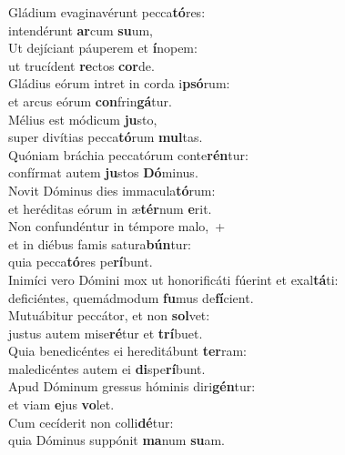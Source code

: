 \evenverse Gládium evaginavérunt pecca\textbf{tó}res:~\*\\
\evenverse intendérunt \textbf{ar}cum \textbf{su}um,\\
\oddverse Ut dejíciant páuperem et \textbf{í}nopem:~\*\\
\oddverse ut trucídent \textbf{re}ctos \textbf{cor}de.\\
\evenverse Gládius eórum intret in corda i\textbf{psó}rum:~\*\\
\evenverse et arcus eórum \textbf{con}frin\textbf{gá}tur.\\
\oddverse Mélius est módicum \textbf{ju}sto,~\*\\
\oddverse super divítias pecca\textbf{tó}rum \textbf{mul}tas.\\
\evenverse Quóniam bráchia peccatórum conte\textbf{rén}tur:~\*\\
\evenverse confírmat autem \textbf{ju}stos \textbf{Dó}minus.\\
\oddverse Novit Dóminus dies immacula\textbf{tó}rum:~\*\\
\oddverse et heréditas eórum in æ\textbf{tér}num \textbf{e}rit.\\
\evenverse Non confundéntur in témpore malo,~+\\
\evenverse  et in diébus famis satura\textbf{bún}tur:~\*\\
\evenverse quia pecca\textbf{tó}res pe\textbf{rí}bunt.\\
\oddverse Inimíci vero Dómini mox ut honorificáti fúerint et exal\textbf{tá}ti:~\*\\
\oddverse deficiéntes, quemádmodum \textbf{fu}mus de\textbf{fí}cient.\\
\evenverse Mutuábitur peccátor, et non \textbf{sol}vet:~\*\\
\evenverse justus autem mise\textbf{ré}tur et \textbf{trí}buet.\\
\oddverse Quia benedicéntes ei hereditábunt \textbf{ter}ram:~\*\\
\oddverse maledicéntes autem ei \textbf{di}spe\textbf{rí}bunt.\\
\evenverse Apud Dóminum gressus hóminis diri\textbf{gén}tur:~\*\\
\evenverse et viam \textbf{e}jus \textbf{vo}let.\\
\oddverse Cum cecíderit non colli\textbf{dé}tur:~\*\\
\oddverse quia Dóminus suppónit \textbf{ma}num \textbf{su}am.\\
